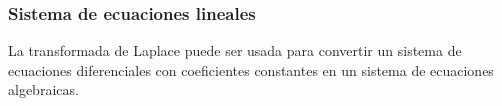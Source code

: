 


\subsubsection{Sistema de ecuaciones lineales}

La transformada de Laplace puede ser usada para convertir un sistema de ecuaciones diferenciales con coeficientes constantes en un sistema de ecuaciones algebraicas. 

